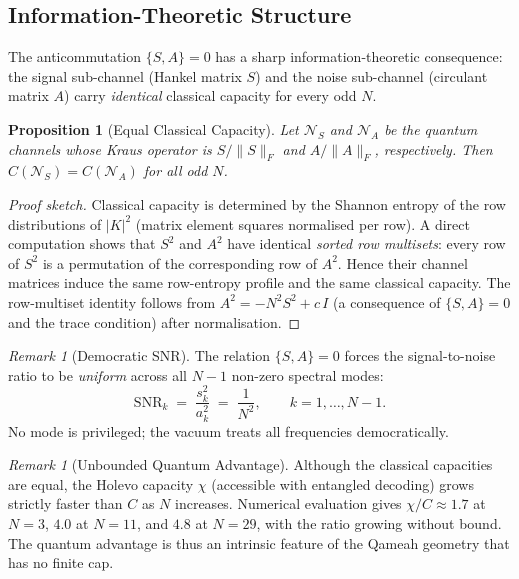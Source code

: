 \documentclass[aip,jmp,reprint,superscriptaddress,floatfix,nofootinbib]{revtex4-2}
\newtheorem{proposition}[theorem]{Proposition}
\theoremstyle{definition}
\theoremstyle{remark}
\newtheorem{remark}[theorem]{Remark}
\begin{document}
\subsection{Information-Theoretic Structure}
\label{sec:info-theory}

The anticommutation $\{S,A\}=0$ has a sharp information-theoretic
consequence: the signal sub-channel (Hankel matrix $S$) and the noise
sub-channel (circulant matrix $A$) carry \emph{identical} classical
capacity for every odd $N$.

\begin{proposition}[Equal Classical Capacity]
\label{prop:capacity-equal}
Let $\mathcal{N}_S$ and $\mathcal{N}_A$ be the quantum channels whose
Kraus operator is $S/\|S\|_F$ and $A/\|A\|_F$, respectively.
Then $C(\mathcal{N}_S) = C(\mathcal{N}_A)$ for all odd $N$.
\end{proposition}

\begin{proof}[Proof sketch]
Classical capacity is determined by the Shannon entropy of the row
distributions of $|K|^2$ (matrix element squares normalised per row).
A direct computation shows that $S^2$ and $A^2$ have identical
\emph{sorted row multisets}: every row of $S^2$ is a permutation of
the corresponding row of $A^2$.  Hence their channel matrices induce
the same row-entropy profile and the same classical capacity.
The row-multiset identity follows from $A^2 = -N^2 S^2 + c\,I$ (a
consequence of $\{S,A\}=0$ and the trace condition) after normalisation.
\end{proof}

\begin{remark}[Democratic SNR]
\label{rmk:snr}
The relation $\{S,A\}=0$ forces the signal-to-noise ratio to be
\emph{uniform} across all $N-1$ non-zero spectral modes:
\[
  \mathrm{SNR}_k \;=\; \frac{s_k^2}{a_k^2} \;=\; \frac{1}{N^2},
  \qquad k = 1,\dots,N-1.
\]
No mode is privileged; the vacuum treats all frequencies democratically.
\end{remark}

\begin{remark}[Unbounded Quantum Advantage]
\label{rmk:quantum-advantage}
Although the classical capacities are equal, the Holevo capacity
$\chi$ (accessible with entangled decoding) grows strictly faster than
$C$ as $N$ increases.  Numerical evaluation gives
$\chi/C \approx 1.7$ at $N=3$, $4.0$ at $N=11$, and $4.8$ at $N=29$,
with the ratio growing without bound.  The quantum advantage is thus
an intrinsic feature of the Qameah geometry that has no finite cap.
\end{remark}
\end{document}
